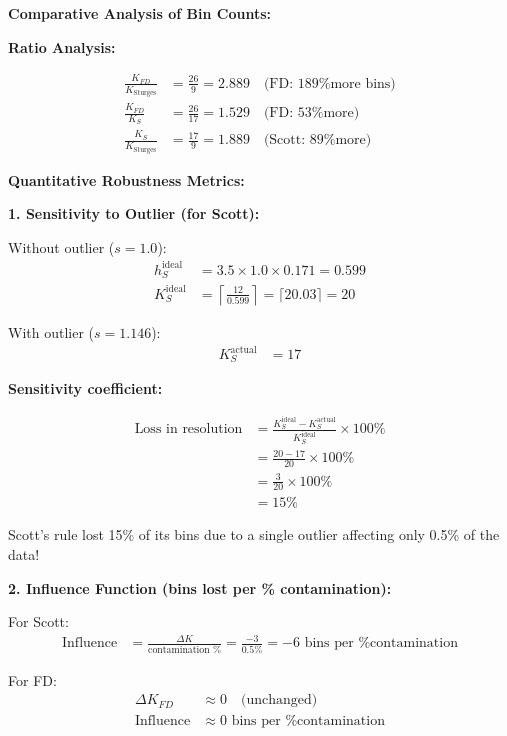 \documentclass[12pt]{article}
\begin{document}
\begin{solution}
\textbf{Comparative Analysis of Bin Counts:}

\textbf{Ratio Analysis:}

\begin{align*}
\frac{K_{FD}}{K_{\text{Sturges}}} &= \frac{26}{9} = 2.889 \quad \text{(FD: 189\% more bins)} \\
\frac{K_{FD}}{K_S} &= \frac{26}{17} = 1.529 \quad \text{(FD: 53\% more)} \\
\frac{K_S}{K_{\text{Sturges}}} &= \frac{17}{9} = 1.889 \quad \text{(Scott: 89\% more)}
\end{align*}

\textbf{Quantitative Robustness Metrics:}

\textbf{1. Sensitivity to Outlier (for Scott):}

Without outlier (\(s = 1.0\)):
\begin{align*}
h_S^{\text{ideal}} &= 3.5 \times 1.0 \times 0.171 = 0.599 \\
K_S^{\text{ideal}} &= \left\lceil \frac{12}{0.599} \right\rceil = \lceil 20.03 \rceil = 20
\end{align*}

With outlier (\(s = 1.146\)):
\begin{align*}
K_S^{\text{actual}} &= 17
\end{align*}

\textbf{Sensitivity coefficient:}

\begin{align*}
\text{Loss in resolution} &= \frac{K_S^{\text{ideal}} - K_S^{\text{actual}}}{K_S^{\text{ideal}}} \times 100\% \\
&= \frac{20 - 17}{20} \times 100\% \\
&= \frac{3}{20} \times 100\% \\
&= 15\%
\end{align*}

Scott's rule lost 15\% of its bins due to a single outlier affecting only 0.5\% of the data!

\textbf{2. Influence Function (bins lost per \% contamination):}

For Scott:
\begin{align*}
\text{Influence} &= \frac{\Delta K}{\text{contamination \%}} = \frac{-3}{0.5\%} = -6 \text{ bins per \% contamination}
\end{align*}

For FD:
\begin{align*}
\Delta K_{FD} &\approx 0 \quad \text{(unchanged)} \\
\text{Influence} &\approx 0 \text{ bins per \% contamination}
\end{align*}


\end{solution}
\end{document}
